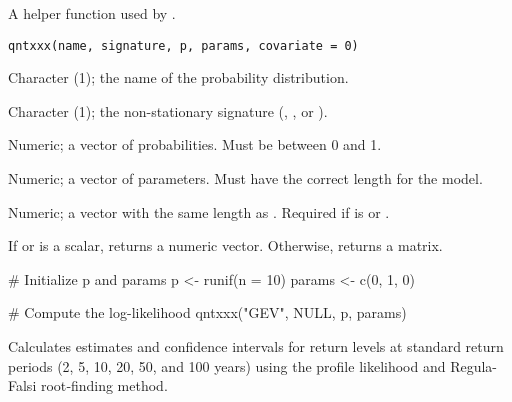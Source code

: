 \documentclass[a4paper]{book}
\begin{document}
%
\begin{Description}
A helper function used by .
\end{Description}
%
\begin{Usage}
\begin{verbatim}
qntxxx(name, signature, p, params, covariate = 0)
\end{verbatim}
\end{Usage}
%
\begin{Arguments}
\begin{ldescription}
\item[\code{name}] Character (1); the name of the probability distribution.

\item[\code{signature}] Character (1); the non-stationary signature (, , or ).

\item[\code{p}] Numeric; a vector of probabilities. Must be between 0 and 1.

\item[\code{params}] Numeric; a vector of parameters. Must have the correct length for the model.

\item[\code{covariate}] Numeric; a vector with the same length as .
Required if  is  or .
\end{ldescription}
\end{Arguments}
%
\begin{Value}
If  or  is a scalar, returns a numeric vector. Otherwise, returns a matrix.
\end{Value}
%
\begin{SeeAlso}
\end{SeeAlso}
%
\begin{Examples}
\begin{ExampleCode}
# Initialize p and params
p <- runif(n = 10)
params <- c(0, 1, 0)

# Compute the log-likelihood
qntxxx("GEV", NULL, p, params)

\end{ExampleCode}
\end{Examples}
%
\begin{Description}
Calculates estimates and confidence intervals for return levels at standard
return periods (2, 5, 10, 20, 50, and 100 years) using the profile likelihood
and Regula-Falsi root‐finding method.
\end{Description}
\end{document}
